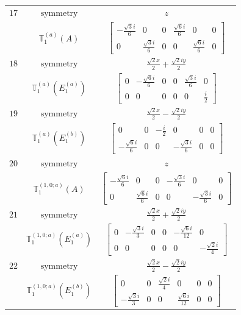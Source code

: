 \documentclass[fleqn,8pt,landscape]{jsarticle}
\begin{document}
\begin{longtable}{ccc}
$ 17 $ & $ \text{symmetry} $ & $ z $ \\
$  $ & $ \mathbb{T}_{1}^{(a)}(A) $ & $ \begin{bmatrix} - \frac{\sqrt{3} i}{6} & 0 & 0 & \frac{\sqrt{6} i}{6} & 0 & 0 \\ 0 & \frac{\sqrt{3} i}{6} & 0 & 0 & \frac{\sqrt{6} i}{6} & 0 \end{bmatrix} $ \\ \hline
$ 18 $ & $ \text{symmetry} $ & $ \frac{\sqrt{2} x}{2} + \frac{\sqrt{2} i y}{2} $ \\
$  $ & $ \mathbb{T}_{1}^{(a)}(E_{1}^{(a)}) $ & $ \begin{bmatrix} 0 & - \frac{\sqrt{6} i}{6} & 0 & 0 & \frac{\sqrt{3} i}{6} & 0 \\ 0 & 0 & 0 & 0 & 0 & \frac{i}{2} \end{bmatrix} $ \\ \hline
$ 19 $ & $ \text{symmetry} $ & $ \frac{\sqrt{2} x}{2} - \frac{\sqrt{2} i y}{2} $ \\
$  $ & $ \mathbb{T}_{1}^{(a)}(E_{1}^{(b)}) $ & $ \begin{bmatrix} 0 & 0 & - \frac{i}{2} & 0 & 0 & 0 \\ - \frac{\sqrt{6} i}{6} & 0 & 0 & - \frac{\sqrt{3} i}{6} & 0 & 0 \end{bmatrix} $ \\ \hline
$ 20 $ & $ \text{symmetry} $ & $ z $ \\
$  $ & $ \mathbb{T}_{1}^{(1,0;a)}(A) $ & $ \begin{bmatrix} - \frac{\sqrt{6} i}{6} & 0 & 0 & - \frac{\sqrt{3} i}{6} & 0 & 0 \\ 0 & \frac{\sqrt{6} i}{6} & 0 & 0 & - \frac{\sqrt{3} i}{6} & 0 \end{bmatrix} $ \\ \hline
$ 21 $ & $ \text{symmetry} $ & $ \frac{\sqrt{2} x}{2} + \frac{\sqrt{2} i y}{2} $ \\
$  $ & $ \mathbb{T}_{1}^{(1,0;a)}(E_{1}^{(a)}) $ & $ \begin{bmatrix} 0 & - \frac{\sqrt{3} i}{3} & 0 & 0 & - \frac{\sqrt{6} i}{12} & 0 \\ 0 & 0 & 0 & 0 & 0 & - \frac{\sqrt{2} i}{4} \end{bmatrix} $ \\ \hline
$ 22 $ & $ \text{symmetry} $ & $ \frac{\sqrt{2} x}{2} - \frac{\sqrt{2} i y}{2} $ \\
$  $ & $ \mathbb{T}_{1}^{(1,0;a)}(E_{1}^{(b)}) $ & $ \begin{bmatrix} 0 & 0 & \frac{\sqrt{2} i}{4} & 0 & 0 & 0 \\ - \frac{\sqrt{3} i}{3} & 0 & 0 & \frac{\sqrt{6} i}{12} & 0 & 0 \end{bmatrix} $ \\ \hline

\end{longtable}
\end{document}
